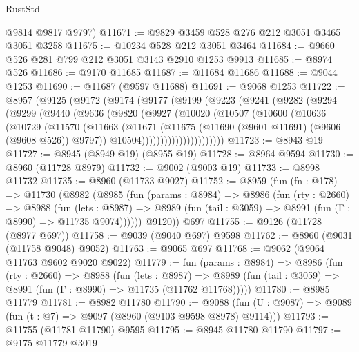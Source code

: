 \begin{lexlean}{RustStd}
\begin{coremodule}
      @9814
      @9817
      @9797)
@11671 := @9829 @3459 @528 @276 @212 @3051 @3465 @3051 @3258
@11675 := @10234 @528 @212 @3051 @3464
@11684 := @9660 @526 @281 @799 @212 @3051 @3143 @2910 @1253 @9913
@11685 := @8974 @526
@11686 := @9170 @11685
@11687 := @11684 @11686
@11688 := @9044 @1253
@11690 := @11687 (@9597 @11688)
@11691 := @9068 @1253
@11722 := @8957
    (@9125
      (@9172
        (@9174
          (@9177
            (@9199
              (@9223
                (@9241
                  (@9282
                    (@9294
                      (@9299
                        (@9440
                          (@9636
                            (@9820
                              (@9927
                                (@10020
                                  (@10507
                                    (@10600
                                      (@10636
                                        (@10729
                                          (@11570
                                            (@11663
                                              (@11671
                                                (@11675
                                                  (@11690
                                                    (@9601 @11691)
                                                    (@9606 (@9608 @526))
                                                    @9797))
                                                @10504))))))))))))))))))))))
@11723 := @8943 @19
@11727 := @8945 (@8949 @19) (@8955 @19)
@11728 := @8964 @9594
@11730 := @8960 (@11728 @8979)
@11732 := @9002 (@9003 @19)
@11733 := @8998 @11732
@11735 := @8960 (@11733 @9027)
@11752 := @8959
    (fun (fn : @178) =>
    @11730
      (@8982
        (@8985
          (fun (params : @8984) =>
          @8986
            (fun (rty : @2660) =>
            @8988
              (fun (lets : @8987) =>
              @8989 (fun (tail : @3059) => @8991 (fun (Γ : @8990) => @11735 @9074))))))
        @9120))
    @697
@11755 := @9126 (@11728 (@8977 @697))
@11758 := @9039 (@9040 @697) @9598
@11762 := @8960 (@9031 (@11758 @9048) @9052)
@11763 := @9065 @697
@11768 := @9062 (@9064 @11763 @9602 @9020 @9022)
@11779 := fun (params : @8984) =>
  @8986
    (fun (rty : @2660) =>
    @8988
      (fun (lets : @8987) =>
      @8989 (fun (tail : @3059) => @8991 (fun (Γ : @8990) => @11735 (@11762 @11768)))))
@11780 := @8985 @11779
@11781 := @8982 @11780
@11790 := @9088 (fun (U : @9087) => @9089 (fun (t : @7) => @9097 (@8960 (@9103 @9598 @8978) @9114)))
@11793 := @11755 (@11781 @11790) @9595
@11795 := @8945 @11780 @11790
@11797 := @9175 @11779 @3019

\end{coremodule}
\end{lexlean}
